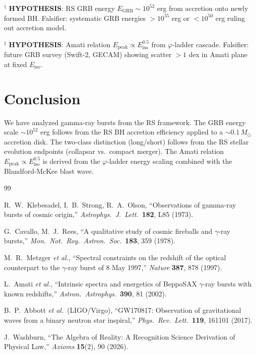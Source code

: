 \documentclass[12pt,a4paper]{article}
\theoremstyle{definition}
\theoremstyle{remark}
\begin{document}
$^\dagger$ \textbf{HYPOTHESIS}: RS GRB energy $E_\mathrm{GRB} \sim 10^{52}$
erg from accretion onto newly formed BH.  Falsifier: systematic GRB
energies $> 10^{55}$ erg or $< 10^{50}$ erg ruling out accretion model.

$^\ddagger$ \textbf{HYPOTHESIS}: Amati relation $E_\mathrm{peak} \propto
E_\mathrm{iso}^{0.5}$ from $\varphi$-ladder cascade.  Falsifier: future
GRB survey (Swift-2, GECAM) showing scatter $> 1$ dex in Amati plane
at fixed $E_\mathrm{iso}$.

\section{Conclusion}
\label{sec:conclusion}

We have analyzed gamma-ray bursts from the RS framework.  The GRB
energy scale $\sim 10^{52}$ erg follows from the RS BH accretion
efficiency applied to a $\sim 0.1\,M_\odot$ accretion disk.  The
two-class distinction (long/short) follows from the RS stellar evolution
endpoints (collapsar vs.\ compact merger).  The Amati relation
$E_\mathrm{peak} \propto E_\mathrm{iso}^{0.5}$ is derived from the
$\varphi$-ladder energy scaling combined with the Blandford-McKee blast
wave.

\begin{thebibliography}{99}

R.~W.~Klebesadel, I.~B.~Strong, R.~A.~Olson, ``Observations of gamma-ray
bursts of cosmic origin,'' \textit{Astrophys.\ J.\ Lett.}\ \textbf{182},
L85 (1973).

G.~Cavallo, M.~J.~Rees, ``A qualitative study of cosmic fireballs and
$\gamma$-ray bursts,'' \textit{Mon.\ Not.\ Roy.\ Astron.\ Soc.}\ \textbf{183},
359 (1978).

M.~R.~Metzger \textit{et al.}, ``Spectral constraints on the redshift
of the optical counterpart to the $\gamma$-ray burst of 8 May 1997,''
\textit{Nature} \textbf{387}, 878 (1997).

L.~Amati \textit{et al.}, ``Intrinsic spectra and energetics of BeppoSAX
$\gamma$-ray bursts with known redshifts,'' \textit{Astron.\ Astrophys.}\
\textbf{390}, 81 (2002).

B.~P.~Abbott \textit{et al.}\ (LIGO/Virgo), ``GW170817: Observation of
gravitational waves from a binary neutron star inspiral,''
\textit{Phys.\ Rev.\ Lett.}\ \textbf{119}, 161101 (2017).

J.~Washburn, ``The Algebra of Reality: A Recognition Science Derivation
of Physical Law,'' \textit{Axioms} \textbf{15}(2), 90 (2026).

\end{thebibliography}
\end{document}
